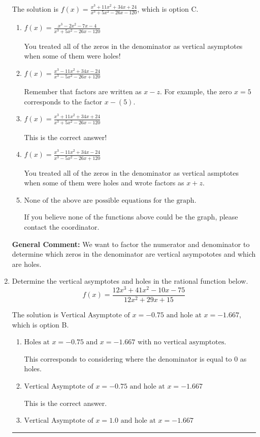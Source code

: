 \documentclass{extbook}[14pt]
\newcommand{\litem}[1]{\item #1

\rule{\textwidth}{0.4pt}}
\begin{document}
\begin{enumerate}
{The solution is \( f(x)=\frac{x^{3} +11 x^{2} +34 x + 24}{x^{3} +5 x^{2} -26 x -120} \), which is option C.\begin{enumerate}[label=\Alph*.]
\item \( f(x)=\frac{x^{3} -2 x^{2} -7 x -4}{x^{3} +5 x^{2} -26 x -120} \)

You treated all of the zeros in the denominator as vertical asymptotes when some of them were holes!
\item \( f(x)=\frac{x^{3} -11 x^{2} +34 x -24}{x^{3} -5 x^{2} -26 x + 120} \)

Remember that factors are written as $x-z$. For example, the zero $x=5$ corresponds to the factor $x-(5)$.
\item \( f(x)=\frac{x^{3} +11 x^{2} +34 x + 24}{x^{3} +5 x^{2} -26 x -120} \)

This is the correct answer!
\item \( f(x)=\frac{x^{3} -11 x^{2} +34 x -24}{x^{3} -5 x^{2} -26 x + 120} \)

You treated all of the zeros in the denominator as vertical asmptotes when some of them were holes and wrote factors as $x+z$.
\item \( \text{None of the above are possible equations for the graph.} \)

If you believe none of the functions above could be the graph, please contact the coordinator.
\end{enumerate}

\textbf{General Comment:} We want to factor the numerator and denominator to determine which zeros in the denominator are vertical asympototes and which are holes.
}
\litem{
Determine the vertical asymptotes and holes in the rational function below.
\[ f(x) = \frac{12x^{3} +41 x^{2} -10 x -75}{12x^{2} +29 x + 15} \]

The solution is \( \text{Vertical Asymptote of } x = -0.75 \text{ and hole at } x = -1.667 \), which is option B.\begin{enumerate}[label=\Alph*.]
\item \( \text{Holes at } x = -0.75 \text{ and } x = -1.667 \text{ with no vertical asymptotes.} \)

This corresponds to considering where the denominator is equal to 0 as holes.
\item \( \text{Vertical Asymptote of } x = -0.75 \text{ and hole at } x = -1.667 \)

This is the correct answer.
\item \( \text{Vertical Asymptote of } x = 1.0 \text{ and hole at } x = -1.667 \)


\end{enumerate}}
\end{enumerate}
\end{document}
